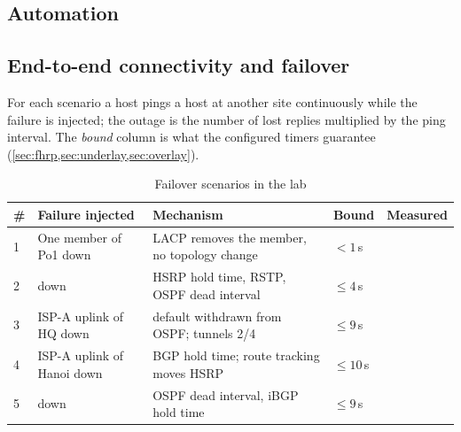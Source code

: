 \subsection{Automation}\label{sec:test-automation}

\subsection{End-to-end connectivity and failover}\label{sec:failover}
For each scenario a host pings a host at another site continuously while the failure is injected; the
outage is the number of lost replies multiplied by the ping interval. The \emph{bound} column is what the
configured timers guarantee (\cref{sec:fhrp,sec:underlay,sec:overlay}).

\begin{table}[H]\centering\small
\caption{Failover scenarios in the lab}\label{tab:failover}
\begin{tabularx}{\textwidth}{@{}l Y Y l l@{}}
\toprule
\textbf{\#} & \textbf{Failure injected} & \textbf{Mechanism} & \textbf{Bound} & \textbf{Measured} \\
 & One member of Po1 down & LACP removes the member, no topology change & $<1$\,s & \todo{} \\
2 &  down & HSRP hold time, RSTP, OSPF dead interval & $\leq 4$\,s & \todo{} \\
3 & ISP-A uplink of HQ down & default withdrawn from OSPF; tunnels 2/4 & $\leq 9$\,s & \todo{} \\
4 & ISP-A uplink of Hanoi down & BGP hold time; route tracking moves HSRP & $\leq 10$\,s & \todo{} \\
5 &  down & OSPF dead interval, iBGP hold time & $\leq 9$\,s & \todo{} \\
\bottomrule
\end{tabularx}
\end{table}


